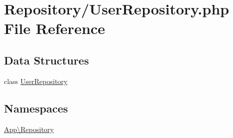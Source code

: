 \hypertarget{_user_repository_8php}{}\section{Repository/\+User\+Repository.php File Reference}
\label{_user_repository_8php}
\subsection*{Data Structures}
\begin{DoxyCompactItemize}
\item 
class \mbox{\hyperlink{class_app_1_1_repository_1_1_user_repository}{User\+Repository}}
\end{DoxyCompactItemize}
\subsection*{Namespaces}
\begin{DoxyCompactItemize}
\item 
 \mbox{\hyperlink{namespace_app_1_1_repository}{App\textbackslash{}\+Repository}}
\end{DoxyCompactItemize}
